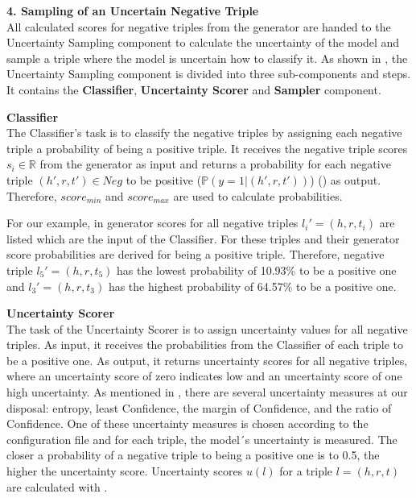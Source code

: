 \textbf{4. Sampling of an Uncertain Negative Triple}\\
%
All calculated scores for negative triples from the generator are handed to the Uncertainty Sampling component to calculate the uncertainty of the model and sample a triple where the model is uncertain how to classify it.
As shown in , the Uncertainty Sampling component is divided into three sub-components and steps.
It contains the \textbf{Classifier}, \textbf{Uncertainty Scorer} and \textbf{Sampler} component.


\textbf{Classifier} \\
The Classifier's task is to classify the negative triples by assigning each negative triple a probability of being a positive triple.
It receives the negative triple scores $s_i \in \mathbb{R}$ from the generator as input and returns a probability for each negative triple $(h',r,t') \in Neg$ to be positive  ($\mathbb{P}(y = 1| (h',r,t'))$) () as output. 
Therefore, $score_{min}$ and $score_{max}$ are used to calculate probabilities.


For our example, in  generator scores for all negative triples $l_i' = (h, r, t_i)$ are listed which are the input of the Classifier.
For these triples and their generator score probabilities are derived for being a positive triple.
Therefore, negative triple $l_5' = (h,r,t_5)$ has the lowest probability of 10.93\% to be a positive one and $l_3' = (h,r,t_3)$ has the highest probability of 64.57\% to be a positive one.

\textbf{Uncertainty Scorer} \\
The task of the Uncertainty Scorer is to assign uncertainty values for all negative triples.
As input, it receives the probabilities from the Classifier of each triple to be a positive one.
As output, it returns uncertainty scores for all negative triples, where an uncertainty score of zero indicates low and an uncertainty score of one high uncertainty.
As mentioned in , there are several uncertainty measures at our disposal:
entropy, least Confidence, the margin of Confidence, and the ratio of Confidence.
One of these uncertainty measures is chosen according to the configuration file and for each triple, the model´s uncertainty is measured.
The closer a probability of a negative triple to being a positive one is to 0.5, the higher the uncertainty score. 
Uncertainty scores $u(l)$ for a triple $l = (h,r,t)$ are calculated with .

